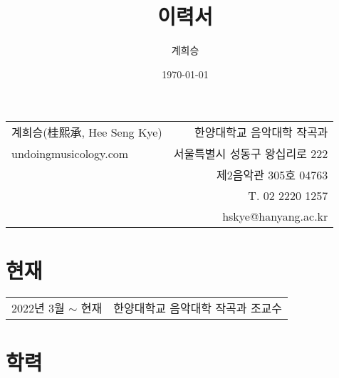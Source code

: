 \documentclass[dvipdfmx,a4paper]{article}
\title{이력서}
\author{계희승}
\date{\today}
\begin{document}
  \renewcommand{\headrulewidth}{0pt}
  \fancyhf{}
  \fancyfoot[RE,RO]{\small \thepage}
  
  \hspace*{-0.8cm}
  \begin{tabular}{p{9.21cm} r}
    {\large 계희승(桂熙承, Hee Seng Kye)} & 한양대학교 음악대학 작곡과\\
    undoingmusicology.com & 서울특별시 성동구 왕십리로 222\\
    & 제2음악관 305호 04763\\
    & T. 02 2220 1257\\
    & hskye@hanyang.ac.kr
  \end{tabular}
  
  \vspace{15mm}
  
  \section*{\normalsize 현재}
  
  \hspace*{-0.25cm}
  \begin{tabular}{p{4.0cm} l}
    2022년 3월 $\sim$ 현재 & 한양대학교 음악대학 작곡과 조교수
  \end{tabular}
  
  \vspace*{2.5mm}
  
  \section*{\normalsize 학력}
  
\end{document}
